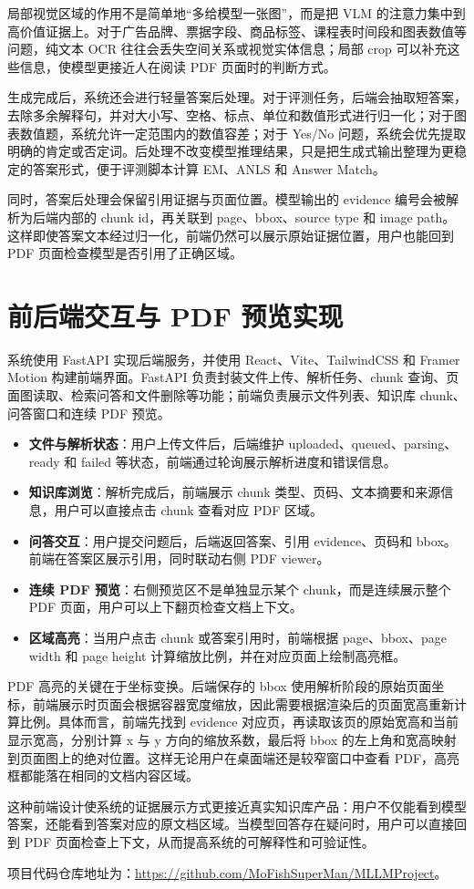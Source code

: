 局部视觉区域的作用不是简单地“多给模型一张图”，而是把 VLM 的注意力集中到高价值证据上。对于广告品牌、票据字段、商品标签、课程表时间段和图表数值等问题，纯文本 OCR 往往会丢失空间关系或视觉实体信息；局部 crop 可以补充这些信息，使模型更接近人在阅读 PDF 页面时的判断方式。

生成完成后，系统还会进行轻量答案后处理。对于评测任务，后端会抽取短答案，去除多余解释句，并对大小写、空格、标点、单位和数值形式进行归一化；对于图表数值题，系统允许一定范围内的数值容差；对于 Yes/No 问题，系统会优先提取明确的肯定或否定词。后处理不改变模型推理结果，只是把生成式输出整理为更稳定的答案形式，便于评测脚本计算 EM、ANLS 和 Answer Match。

同时，答案后处理会保留引用证据与页面位置。模型输出的 evidence 编号会被解析为后端内部的 chunk id，再关联到 page、bbox、source type 和 image path。这样即使答案文本经过归一化，前端仍然可以展示原始证据位置，用户也能回到 PDF 页面检查模型是否引用了正确区域。

\section{前后端交互与 PDF 预览实现}

系统使用 FastAPI 实现后端服务，并使用 React、Vite、TailwindCSS 和 Framer Motion 构建前端界面。FastAPI 负责封装文件上传、解析任务、chunk 查询、页面图读取、检索问答和文件删除等功能；前端负责展示文件列表、知识库 chunk、问答窗口和连续 PDF 预览。

\begin{itemize}
  \item \textbf{文件与解析状态}：用户上传文件后，后端维护 uploaded、queued、parsing、ready 和 failed 等状态，前端通过轮询展示解析进度和错误信息。
  \item \textbf{知识库浏览}：解析完成后，前端展示 chunk 类型、页码、文本摘要和来源信息，用户可以直接点击 chunk 查看对应 PDF 区域。
  \item \textbf{问答交互}：用户提交问题后，后端返回答案、引用 evidence、页码和 bbox。前端在答案区展示引用，同时联动右侧 PDF viewer。
  \item \textbf{连续 PDF 预览}：右侧预览区不是单独显示某个 chunk，而是连续展示整个 PDF 页面，用户可以上下翻页检查文档上下文。
  \item \textbf{区域高亮}：当用户点击 chunk 或答案引用时，前端根据 page、bbox、page width 和 page height 计算缩放比例，并在对应页面上绘制高亮框。
\end{itemize}

PDF 高亮的关键在于坐标变换。后端保存的 bbox 使用解析阶段的原始页面坐标，前端展示时页面会根据容器宽度缩放，因此需要根据渲染后的页面宽高重新计算比例。具体而言，前端先找到 evidence 对应页，再读取该页的原始宽高和当前显示宽高，分别计算 x 与 y 方向的缩放系数，最后将 bbox 的左上角和宽高映射到页面图上的绝对位置。这样无论用户在桌面端还是较窄窗口中查看 PDF，高亮框都能落在相同的文档内容区域。

这种前端设计使系统的证据展示方式更接近真实知识库产品：用户不仅能看到模型答案，还能看到答案对应的原文档区域。当模型回答存在疑问时，用户可以直接回到 PDF 页面检查上下文，从而提高系统的可解释性和可验证性。

项目代码仓库地址为：\url{https://github.com/MoFishSuperMan/MLLMProject}。
